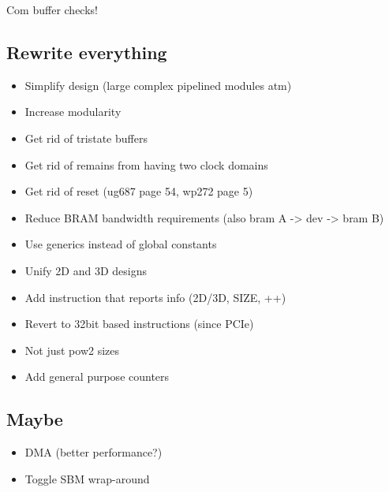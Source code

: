 \TODO Com buffer checks!

\subsection{Rewrite everything}

\begin{itemize}
    \item Simplify design (large complex pipelined modules atm)
    \item Increase modularity
    \item Get rid of tristate buffers
    \item Get rid of remains from having two clock domains
    \item Get rid of reset (ug687 page 54, wp272 page 5)
    \item Reduce BRAM bandwidth requirements (also bram A -> dev -> bram B)
    \item Use generics instead of global constants
    \item Unify 2D and 3D designs
    \item Add instruction that reports info (2D/3D, SIZE, ++)
    \item Revert to 32bit based instructions (since PCIe)
    \item Not just pow2 sizes
    \item Add general purpose counters
\end{itemize}

\subsection{Maybe}

\begin{itemize}
    \item DMA (better performance?)
    \item Toggle SBM wrap-around
\end{itemize}

